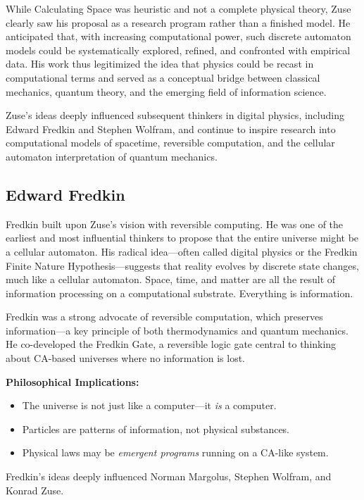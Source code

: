 \documentclass[12pt]{article}
\begin{document}
While Calculating Space was heuristic and not a complete physical theory, Zuse clearly saw his proposal as a research program rather than a finished model. He anticipated that, with increasing computational power, such discrete automaton models could be systematically explored, refined, and confronted with empirical data. His work thus legitimized the idea that physics could be recast in computational terms and served as a conceptual bridge between classical mechanics, quantum theory, and the emerging field of information science.

Zuse’s ideas deeply influenced subsequent thinkers in digital physics, including Edward Fredkin and Stephen Wolfram, and continue to inspire research into computational models of spacetime, reversible computation, and the cellular automaton interpretation of quantum mechanics.

\subsection*{Edward Fredkin}
Fredkin \cite{fredkin} built upon Zuse’s vision with reversible computing. He was one of the earliest and most influential thinkers to propose that the entire universe might be a cellular automaton. His radical idea—often called digital physics or the Fredkin Finite Nature Hypothesis—suggests that reality evolves by discrete state changes, much like a cellular automaton. Space, time, and matter are all the result of information processing on a computational substrate. Everything is information.

Fredkin was a strong advocate of reversible computation, which preserves information—a key principle of both thermodynamics and quantum mechanics. He co-developed the Fredkin Gate, a reversible logic gate central to thinking about CA-based universes where no information is lost.

\textbf{Philosophical Implications:}
\begin{itemize}
  \item The universe is not just like a computer—it \emph{is} a computer.
  \item Particles are patterns of information, not physical substances.
  \item Physical laws may be \emph{emergent programs} running on a CA-like system.
\end{itemize}

Fredkin’s ideas deeply influenced Norman Margolus, Stephen Wolfram, and Konrad Zuse.
\end{document}
